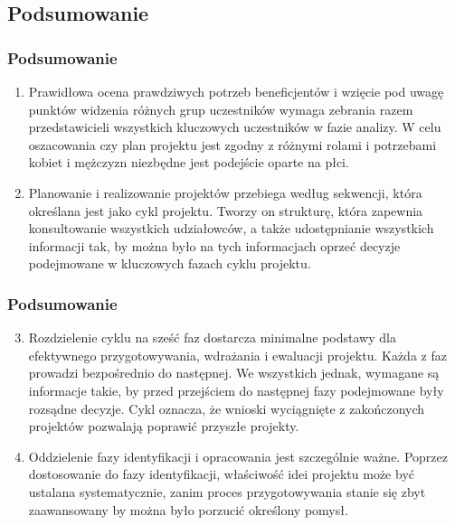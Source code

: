 \documentclass{beamer}
\begin{document}
\subsection[]{Podsumowanie}

\begin{frame}\frametitle{Podsumowanie}
	\begin{enumerate}
	    
	    \item Prawidłowa ocena prawdziwych potrzeb beneficjentów i wzięcie pod uwagę punktów widzenia różnych grup uczestników wymaga zebrania razem przedstawicieli wszystkich kluczowych uczestników w fazie analizy. W celu oszacowania czy plan projektu jest zgodny z różnymi rolami i potrzebami kobiet i mężczyzn niezbędne jest podejście oparte na płci.  

        \item Planowanie i realizowanie projektów przebiega według sekwencji, która określana jest jako cykl projektu. Tworzy on strukturę, która zapewnia konsultowanie wszystkich udziałowców, a także udostępnianie wszystkich informacji tak, by można było na tych informacjach oprzeć decyzje podejmowane w kluczowych fazach cyklu projektu. 
        
     
	\end{enumerate}
\end{frame}

\begin{frame}\frametitle{Podsumowanie}
	\begin{enumerate}
	    \setcounter{enumi}{2}
	   
        \item Rozdzielenie cyklu na sześć faz dostarcza minimalne podstawy dla efektywnego przygotowywania, wdrażania i ewaluacji projektu. Każda z faz prowadzi bezpośrednio do następnej. We wszystkich jednak, wymagane są informacje takie, by przed przejściem do następnej fazy podejmowane były rozsądne decyzje. Cykl oznacza, że wnioski wyciągnięte z zakończonych projektów pozwalają poprawić przyszłe projekty. 

        \item Oddzielenie fazy identyfikacji i opracowania jest szczególnie ważne. Poprzez dostosowanie do fazy identyfikacji, właściwość idei projektu może być ustalana systematycznie, zanim proces przygotowywania stanie się zbyt zaawansowany by można było porzucić określony pomysł. 

    \end{enumerate}
\end{frame}
\end{document}

